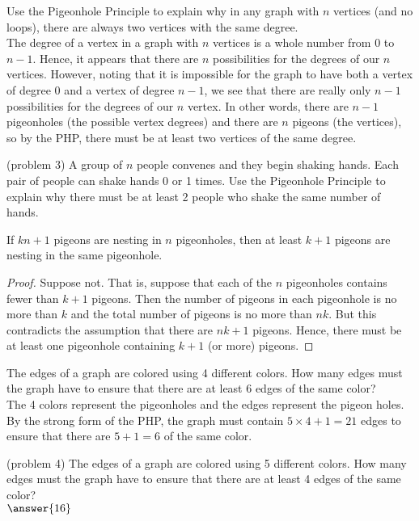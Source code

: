 \documentclass[handout]{ximera}
\begin{document}
\begin{example}[example 3]
Use the Pigeonhole Principle to explain why in any graph with $n$ vertices (and no loops), there are always two vertices with the same degree.\\
The degree of a vertex in a graph with $n$ vertices is a whole number from 0 to $n-1$.  Hence, it appears that there are $n$ possibilities 
for the degrees of our $n$ vertices.  However, noting that it is impossible for the graph to have both a vertex of degree 0 and a vertex of 
degree $n-1$, we see that there are really only $n-1$ possibilities for the degrees of our $n$ vertex. In other words, 
there are $n-1$ pigeonholes (the possible vertex degrees) and there are $n$ pigeons (the vertices), so by the PHP, 
there must be at least two vertices of the same degree.
\end{example}

\begin{problem}(problem 3)
A group of $n$ people convenes and they begin shaking hands. Each pair of people can shake hands 0 or 1 times.
Use the Pigeonhole Principle to explain why there must be at least 2 people who shake the same number of hands.
\end{problem}

\begin{proposition}
If $kn+1$ pigeons are nesting in $n$ pigeonholes, then at least $k+1$ pigeons are nesting in the same pigeonhole.
\end{proposition}

\begin{proof}
Suppose not.  That is, suppose that each of the $n$ pigeonholes contains fewer than $k+1$ pigeons.  Then the number of pigeons in each pigeonhole is no more than $k$
and the total number of pigeons is no more than $nk$.  But this contradicts the assumption that there are $nk+1$ pigeons. Hence, there must be at least one pigeonhole containing 
$k+1$ (or more) pigeons.
\end{proof}

\begin{example}[example 4]
The edges of a graph are colored using 4 different colors.  How many edges must the graph have to ensure that there are at least 6 edges of the same color?\\
The 4 colors represent the pigeonholes and the edges represent the pigeon holes. By the strong form of the PHP, the graph must contain $5\times 4 + 1= 21$ edges to
ensure that there are $5+1=6$ of the same color.
\end{example}

\begin{problem}(problem 4)
The edges of a graph are colored using 5 different colors.  How many edges must the graph have to ensure that there are at least 4 edges of the same color?\\
$\answer{16}$
\end{problem}
\end{document}
